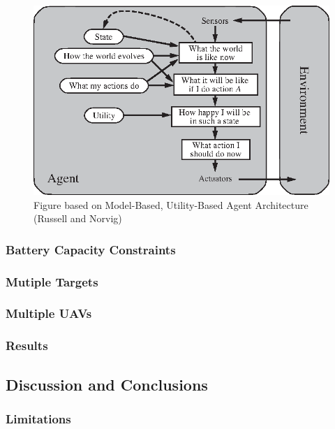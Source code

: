 \begin{figure}
    \centering
    \includegraphics{Chapters/MultiAgentTargetDetection/BayesianFiltering/Figs/utility-based-agent.eps}
    \caption{Figure based on Model-Based, Utility-Based Agent Architecture (Russell and Norvig)\cite[p.~54]{AIAMA}}
    \label{fig:agent_env_interaction}
\end{figure}

\subsubsection{Battery Capacity Constraints}

\subsubsection{Mutiple Targets}

\subsubsection{Multiple UAVs}

\subsubsection{Results}

\subsection{Discussion and Conclusions}
\subsubsection{Limitations}
